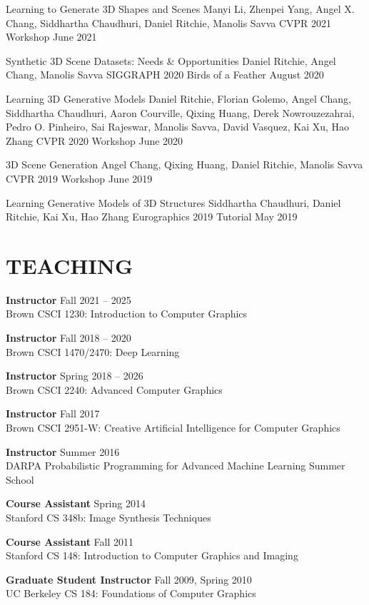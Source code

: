 \documentclass[line,margin]{res}
\begin{document}
\begin{resume}
\workshop
{Learning to Generate 3D Shapes and Scenes}
{Manyi Li, Zhenpei Yang, Angel X. Chang, Siddhartha Chaudhuri, Daniel Ritchie, Manolis Savva}
{CVPR 2021 Workshop}
{June 2021}

\workshop
{Synthetic 3D Scene Datasets: Needs \& Opportunities}
{Daniel Ritchie, Angel Chang, Manolis Savva}
{SIGGRAPH 2020 Birds of a Feather}
{August 2020}

\workshop
{Learning 3D Generative Models}
{Daniel Ritchie, Florian Golemo, Angel Chang, Siddhartha Chaudhuri, Aaron Courville, Qixing Huang, Derek Nowrouzezahrai, Pedro O. Pinheiro, Sai Rajeswar, Manolis Savva, David Vasquez, Kai Xu, Hao Zhang}
{CVPR 2020 Workshop}
{June 2020}

\workshop
{3D Scene Generation}
{Angel Chang, Qixing Huang, Daniel Ritchie, Manolis Savva}
{CVPR 2019 Workshop}
{June 2019}

\tutorial
{Learning Generative Models of 3D Structures}
{Siddhartha Chaudhuri, Daniel Ritchie, Kai Xu, Hao Zhang}
{Eurographics 2019 Tutorial}
{May 2019}


\section{TEACHING}

\newcommand{\teach}[3] {
	\textbf{#1} \hfill #3\\
	#2
}

\teach
{Instructor}
{Brown CSCI 1230: Introduction to Computer Graphics}
{Fall 2021 -- 2025}

\teach
{Instructor}
{Brown CSCI 1470/2470: Deep Learning}
{Fall 2018 -- 2020}

\teach
{Instructor}
{Brown CSCI 2240: Advanced Computer Graphics}
{Spring 2018 -- 2026}

\teach
{Instructor}
{Brown CSCI 2951-W: Creative Artificial Intelligence for Computer Graphics}
{Fall 2017}

\teach
{Instructor}
{DARPA Probabilistic Programming for Advanced Machine Learning Summer School}
{Summer 2016}

\teach
{Course Assistant}
{Stanford CS 348b: Image Synthesis Techniques}
{Spring 2014}

\teach
{Course Assistant}
{Stanford CS 148: Introduction to Computer Graphics and Imaging}
{Fall 2011}

\teach
{Graduate Student Instructor}
{UC Berkeley CS 184: Foundations of Computer Graphics}
{Fall 2009, Spring 2010}


\end{resume}
\end{document}
